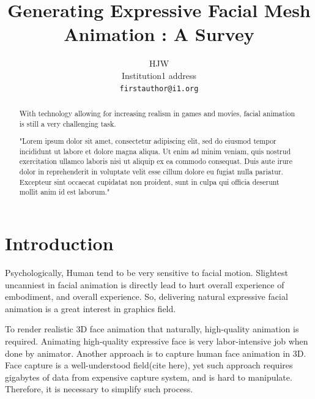 \documentclass[10pt,twocolumn,letterpaper]{article}
\begin{document}
\title{Generating Expressive Facial Mesh Animation : A Survey}

\author{
HJW\\
Institution1 address\\
{\tt\small firstauthor@i1.org}
}
\maketitle

\begin{abstract}
With technology allowing for increasing realism in games and movies, facial animation is still a very challenging task. 

"Lorem ipsum dolor sit amet, consectetur adipiscing elit, sed do eiusmod tempor incididunt ut labore et dolore magna aliqua. Ut enim ad minim veniam, quis nostrud exercitation ullamco laboris nisi ut aliquip ex ea commodo consequat. Duis aute irure dolor in reprehenderit in voluptate velit esse cillum dolore eu fugiat nulla pariatur. Excepteur sint occaecat cupidatat non proident, sunt in culpa qui officia deserunt mollit anim id est laborum."
\end{abstract}

\section{Introduction}
\label{sec:intro}

Psychologically, Human tend to be very sensitive to facial motion. Slightest uncanniest in facial animation is directly lead to hurt overall experience of embodiment, and overall experience\cite{hansonUpendingUncannyValley}. So, delivering natural expressive facial animation is a great interest in graphics field.

To render realistic 3D face animation that naturally, high-quality animation is required. Animating high-quality expressive face is very labor-intensive job when done by animator. Another approach is to capture human face animation in 3D. Face capture is a well-understood field(cite here), yet such approach requires gigabytes of data from expensive capture system, and is hard to manipulate. Therefore, it is necessary to simplify such process. 
\end{document}

